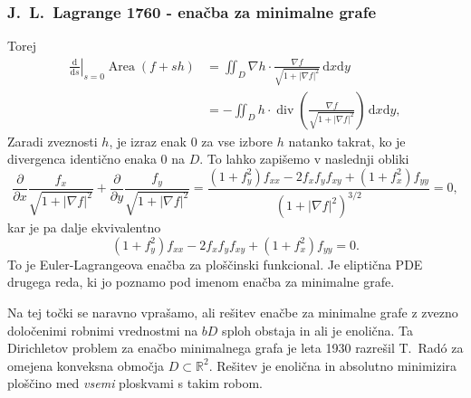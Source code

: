 \documentclass[8pt]{beamer}
\theoremstyle{definition}
\theoremstyle{remark}
\theoremstyle{plain}
\numberwithin{equation}{section}  %
\begin{document}
\begin{frame}
    \frametitle{J.~L.~Lagrange 1760 - enačba za minimalne grafe}

    Torej
    \begin{align*}
        \left.\frac{\mathrm{d}}{\mathrm{d} s}\right|_{s=0} \operatorname{Area}(f+s h) & =\iint_{D} \nabla h \cdot \frac{\nabla f}{\sqrt{1+|\nabla f|^2}} \, \mathrm{d} x \mathrm{d} y \\
        & =-\iint_{D}h \cdot \operatorname{div}\left(\frac{\nabla f}{\sqrt{1+|\nabla f|^2}}\right) \, \mathrm{d} x \mathrm{d} y,
    \end{align*}
    Zaradi zveznosti $h$, je izraz enak $0$ za vse izbore $h$ natanko takrat, ko je divergenca identično enaka $0$ na $D$. To lahko zapišemo v naslednji obliki
    \begin{equation*}
        \frac{\partial}{\partial x} \frac{f_x}{\sqrt{1+|\nabla f|^2}}+\frac{\partial}{\partial y} \frac{f_y}{\sqrt{1+|\nabla f|^2}}=\frac{\left(1+f_y^2\right) f_{x x}-2 f_x f_y f_{x y}+\left(1+f_x^2\right) f_{y y}}{\left(1+|\nabla f|^2\right)^{3 / 2}}=0 , 
    \end{equation*}
    kar je pa dalje ekvivalentno
    \begin{equation*}
        \left(1+f_y^2\right) f_{x x}-2 f_x f_y f_{x y}+\left(1+f_x^2\right) f_{y y}=0 .
    \end{equation*}
    To je \textcolor{red1}{Euler-Lagrangeova enačba} za ploščinski funkcional. Je eliptična PDE drugega reda, ki jo poznamo pod imenom \textcolor{red1}{enačba za minimalne grafe}.
    
    \vspace{0.8em}
    
    Na tej točki se naravno vprašamo, ali rešitev enačbe za minimalne grafe z zvezno določenimi robnimi vrednostmi na $bD$ sploh obstaja in ali je enolična. Ta Dirichletov problem za enačbo minimalnega grafa je leta 1930 razrešil T.~Radó za omejena konveksna območja $D \subset \mathbb{R}^2$. Rešitev je enolična in absolutno minimizira ploščino med \emph{vsemi} ploskvami s takim robom.

\end{frame}
\end{document}
